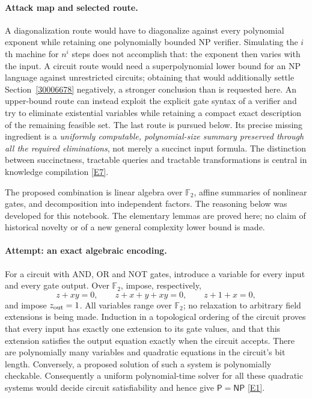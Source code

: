\documentclass[11pt]{article}
\newcommand{\F}{\mathbb{F}}
\newcommand{\eref}[2]{\hyperlink{extra:#1:#2}{[E#2]}}
\begin{document}
\paragraph{Attack map and selected route.}
A diagonalization route would have to diagonalize against every polynomial
exponent while retaining one polynomially bounded NP verifier. Simulating the
$i$th machine for $n^i$ steps does not accomplish that: the exponent then varies
with the input. A circuit route would need a superpolynomial lower bound for
an NP language against unrestricted circuits; obtaining that would additionally
settle Section~\ref{30006678} negatively, a stronger conclusion than is requested
here. An upper-bound route can instead exploit the explicit gate syntax of a
verifier and try to eliminate existential variables while retaining a compact
exact description of the remaining feasible set. The last route is pursued
below. Its precise missing ingredient is a \emph{uniformly computable,
polynomial-size summary preserved through all the required eliminations},
not merely a succinct input formula. The distinction between succinctness,
tractable queries and tractable transformations is central in knowledge
compilation \eref{1}{7}.

The proposed combination is linear algebra over $\F_2$, affine summaries of
nonlinear gates, and decomposition into independent factors. The reasoning
below was developed for this notebook. The elementary lemmas are proved here;
no claim of historical novelty or of a new general complexity lower bound is
made.

\paragraph{Attempt: an exact algebraic encoding.}
For a circuit with AND, OR and NOT gates, introduce a variable for every input
and every gate output. Over $\F_2$, impose, respectively,
\begin{equation}\label{ra:1:gates}
 z+xy=0,\qquad z+x+y+xy=0,\qquad z+1+x=0,
\end{equation}
and impose $z_{\rm out}=1$. All variables range over $\F_2$; no relaxation to
arbitrary field extensions is being made. Induction in a topological ordering
of the circuit proves that every input has exactly one extension to its gate
values, and that this extension satisfies the output equation exactly when
the circuit accepts. There are polynomially many variables and quadratic
equations in the circuit's bit length. Conversely, a proposed solution of such
a system is polynomially checkable. Consequently a uniform polynomial-time
solver for all these quadratic systems would decide circuit satisfiability
and hence give $\mathsf P=\mathsf{NP}$ \eref{1}{1}.
\end{document}
